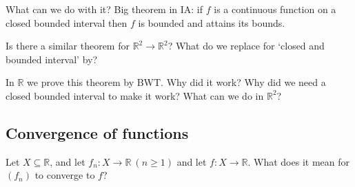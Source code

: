 \documentclass[a4paper]{article}
\begin{document}
What can we do with it? Big theorem in IA: if $f$ is a continuous function on a closed bounded interval then $f$ is bounded and attains its bounds. 

Is there a similar theorem for $ \mathbb{R}^{2}\to \mathbb{R}^{2} $? 
What do we replace for `closed and bounded interval' by? 

In $ \mathbb{R} $ we prove this theorem by BWT. Why did it work? Why did we need a closed bounded interval to make it work? What can we do in $ \mathbb{R}^{2} $? 

\subsection{Convergence of functions}

Let $X \subseteq \mathbb{R}$, and let $ f_n:X\to \mathbb{R}\ (n\ge 1) $ and let $f:X\to \mathbb{R}$. What does it mean for $ (f_n) $ to converge to $f$?
\end{document}
